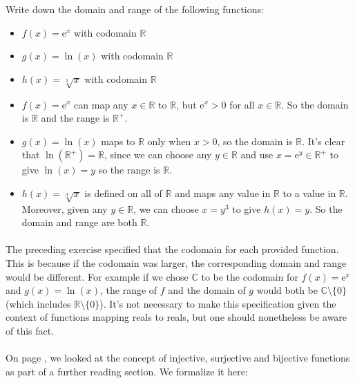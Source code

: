 \documentclass[12pt, a4paper, titlepage, twoside]{article}
\newcommand*{\R}{\mathbb{R}}
\newcommand*{\C}{\mathbb{C}}
\newcommand*{\e}{\textrm{e}}
\newcounter{excount}[subsection]
\begin{document}
	\begin{ex}
		Write down the domain and range of the following functions:
		
		\begin{itemize}
			\item $f(x) = \e^x$ with codomain $\R$
			\item $g(x) = \ln(x)$ with codomain $\R$
			\item $h(x) = \sqrt[3]{x}$ with codomain $\R$
		\end{itemize}
		
		\tcbline
		\hfill
		
		\begin{itemize}
			\item $f(x) = \e^x$ can map any $x \in \R$ to $\R$, but $\e^x > 0$ for all $x \in \R$. So the domain is $\R$ and the range
			is $\R^+$.
			\item $g(x) = \ln(x)$ maps to $\R$ only when $x > 0$, so the domain is $\R$. It's clear that $\ln(\R^+) = \R$, since we can 
			choose any $y \in \R$ and use $x = \e^y \in \R^+$ to give $\ln(x) = y$ so the range is $\R$.
			\item $h(x) = \sqrt[3]{x}$ is defined on all of $\R$ and maps any value in $\R$ to a value in $\R$. Moreover, given any $y \in \R$, we
			can choose $x = y^3$ to give $h(x) = y$. So the domain and range are both $\R$.
		\end{itemize}
	\end{ex}
	
	\paragraph{}
	The preceding exercise specified that the codomain for each provided function. This is because if the codomain was larger, the corresponding
	domain and range would be different. For example if we chose $\C$ to be the codomain for $f(x) = \e^x$ and $g(x) = \ln(x)$, the range of
	$f$ and the domain of $g$ would both be $\C \setminus \{0\}$ (which includes $\R \setminus \{0\}$). It's not necessary to make this 
	specification given the context of functions mapping reals to reals, but one should nonetheless be aware of this fact.
	
	\paragraph{}
	On page \pageref*{fr:countability}, we looked at the concept of injective, surjective and bijective functions as part of a further reading section.
	We formalize it here:\\
	
\end{document}
